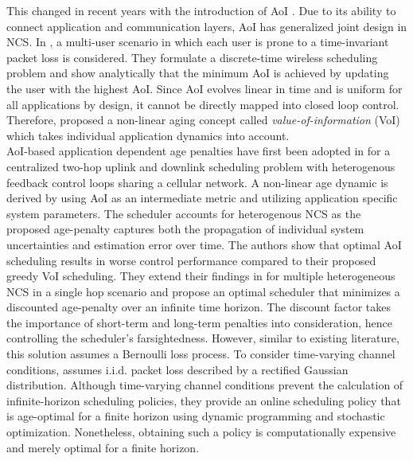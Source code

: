 This changed in recent years with the introduction of AoI \cite{kaul2012real}.
Due to its ability to connect application and communication layers, AoI has
generalized joint design in NCS. In \cite{kadota2018scheduling}, a multi-user
scenario in which each user is prone to a time-invariant packet loss is
considered. They formulate a discrete-time wireless scheduling problem and show
analytically that the minimum AoI is achieved by updating the user with the
highest AoI. Since AoI evolves linear in time and is uniform for all
applications by design, it cannot be directly mapped into closed loop control.
Therefore, \cite{kosta2017age} proposed a non-linear aging concept called
\textit{value-of-information} (VoI) which takes individual application dynamics
into account. \\
AoI-based application dependent age penalties have first been adopted in
\cite{ayan2019age} for a centralized two-hop uplink and downlink scheduling
problem with heterogenous feedback control loops sharing a cellular network. A
non-linear age dynamic is derived by using AoI as an intermediate metric and
utilizing application specific system parameters. The scheduler accounts for
heterogenous NCS as the proposed age-penalty captures both the propagation of
individual system uncertainties and estimation error over time. The authors show
that optimal AoI scheduling results in worse control performance compared to
their proposed greedy VoI scheduling. They extend their findings in
\cite{ayan2020optimal} for multiple heterogeneous NCS in a single hop scenario
and propose an optimal scheduler that minimizes a discounted age-penalty over an
infinite time horizon. The discount factor takes the importance of short-term
and long-term penalties into consideration, hence controlling the scheduler's
farsightedness. However, similar to existing literature, this solution assumes a
Bernoulli loss process. To consider time-varying channel conditions,
\cite{ayan2020aoi} assumes i.i.d. packet loss described by a rectified Gaussian
distribution. Although time-varying channel conditions prevent the calculation
of infinite-horizon scheduling policies, they provide an online scheduling
policy that is age-optimal for a finite horizon using dynamic programming and
stochastic optimization. Nonetheless, obtaining such a policy is computationally
expensive and merely optimal for a finite horizon.

